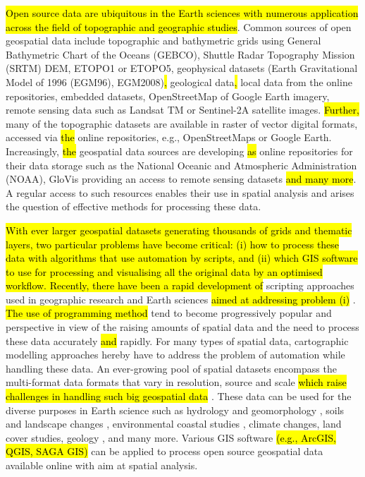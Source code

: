 \documentclass[technologies,article,submit,pdftex,moreauthors]{Definitions/mdpi}
\begin{document}
\hl{Open source data are ubiquitous in the Earth sciences with numerous application across the field of topographic and geographic studies}. Common sources of open geospatial data include topographic and bathymetric grids \cite{Basith,Habib} using General Bathymetric Chart of the Oceans (GEBCO), Shuttle Radar Topography Mission (SRTM) DEM, ETOPO1 or ETOPO5, geophysical datasets (Earth Gravitational Model of 1996 (EGM96), EGM2008)\hl{, }geological data\hl{, }local data from the online repositories, embedded datasets, OpenStreetMap of Google Earth imagery, remote sensing data such as Landsat TM \cite{YIN2021102457} or Sentinel-2A \cite{app13042525} satellite images. \hl{Further,} many of the topographic datasets are available in raster of vector digital formats, accessed via \hl{the }online repositories, e.g., OpenStreetMaps or Google Earth. Increasingly, \hl{the }geospatial data sources are developing \hl{as }online repositories for their data storage such as the National Oceanic and Atmospheric Administration (NOAA), GloVis providing an access to remote sensing datasets \hl{and many more}. A regular access to such resources enables their use in spatial analysis and arises the question of effective methods for processing these data.


\hl{With ever larger geospatial datasets generating thousands of grids and thematic layers, two particular problems have become critical: (i) how to process these data with algorithms that use automation by scripts, and (ii) which GIS software to use for processing and visualising all the original data by an optimised workflow. Recently, there have been a rapid development of }scripting approaches\hl{ }used in geographic research and Earth sciences \hl{aimed at addressing problem (i)} \cite{Rey}. \hl{The use of programming method }tend to become progressively popular and perspective in view of the raising amounts of spatial data and the need to process these data accurately \hl{and} rapidly. For many types of spatial data, cartographic modelling approaches hereby have to address the problem of automation while handling these data. An ever-growing pool of spatial datasets encompass the multi-format data formats that vary in resolution, source and scale \hl{which raise challenges in handling such big geospatial data} \cite{ZHANG2019101374,KIM2023100368}. These data can be used for the diverse purposes in Earth science such as hydrology and geomorphology \cite{Teixeira}, soils and landscape changes \cite{Savulescu}, environmental coastal studies \cite{Hernandez}, climate changes, land cover studies, geology \cite{app7090956}, and many more. Various GIS software \hl{(e.g., ArcGIS, QGIS, SAGA GIS)} can be applied to process open source geospatial data available online with aim at spatial analysis. 
\end{document}
